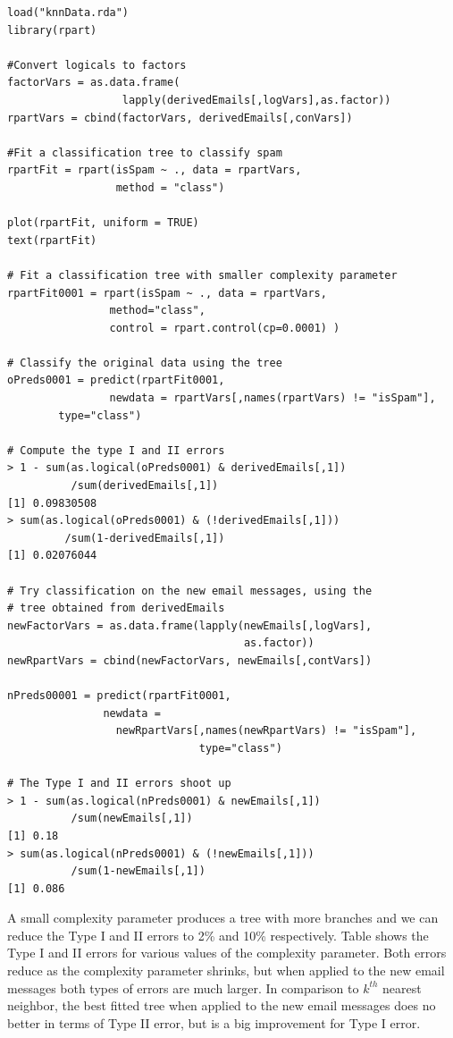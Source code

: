 \begin{verbatim}
load("knnData.rda")
library(rpart)

#Convert logicals to factors
factorVars = as.data.frame(
                  lapply(derivedEmails[,logVars],as.factor))
rpartVars = cbind(factorVars, derivedEmails[,conVars])

#Fit a classification tree to classify spam
rpartFit = rpart(isSpam ~ ., data = rpartVars, 
                 method = "class")

plot(rpartFit, uniform = TRUE)
text(rpartFit)

# Fit a classification tree with smaller complexity parameter
rpartFit0001 = rpart(isSpam ~ ., data = rpartVars, 
                method="class", 
                control = rpart.control(cp=0.0001) )

# Classify the original data using the tree
oPreds0001 = predict(rpartFit0001, 
                newdata = rpartVars[,names(rpartVars) != "isSpam"], 
		type="class")

# Compute the type I and II errors 
> 1 - sum(as.logical(oPreds0001) & derivedEmails[,1])
          /sum(derivedEmails[,1]) 
[1] 0.09830508
> sum(as.logical(oPreds0001) & (!derivedEmails[,1]))
         /sum(1-derivedEmails[,1]) 
[1] 0.02076044

# Try classification on the new email messages, using the 
# tree obtained from derivedEmails
newFactorVars = as.data.frame(lapply(newEmails[,logVars],
                                     as.factor))
newRpartVars = cbind(newFactorVars, newEmails[,contVars])

nPreds00001 = predict(rpartFit0001, 
               newdata =
                 newRpartVars[,names(newRpartVars) != "isSpam"], 
                              type="class")

# The Type I and II errors shoot up 
> 1 - sum(as.logical(nPreds0001) & newEmails[,1])
          /sum(newEmails[,1]) 
[1] 0.18
> sum(as.logical(nPreds0001) & (!newEmails[,1]))
          /sum(1-newEmails[,1])
[1] 0.086
\end{verbatim}

A small complexity parameter produces a tree with more branches
and we can reduce the Type I and
II errors to 2\% and 10\% respectively. 
Table  shows the Type I and II errors for various values
of the complexity parameter.
Both errors reduce as the complexity parameter shrinks,
but when applied to the new email messages both
types of errors are much larger.
In comparison to $k^{th}$ nearest neighbor,
the best fitted tree when applied to
the new email messages does no better 
in terms of Type II error, but is 
a big improvement for Type I error.

